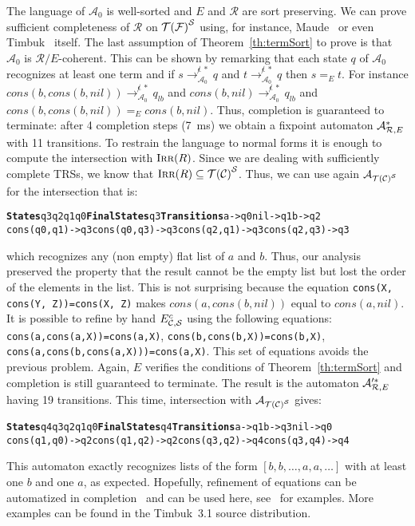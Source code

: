 \documentclass[a4paper,11pt]{llncs}
\renewcommand{\equiv}{=}
\newcommand{\A}{\mathcal{A}}
\def \R {\mathcal{R}}
\newcommand{\timbuk}{{\sf Timbuk}}
\newcommand{\C}{{\cal C}}
\newcommand{\TF}{{\cal T(F)}}
\newcommand{\TC}{{\cal T(C)}}
\def\sorts{\mathcal S}
\def\Eccs{E^c_{\C,\sorts}}
\def\TFS{\TF^\sorts}
\def\TCS{\TC^\sorts}
\DeclareMathOperator{\lirr}{I\textsc{rr}}
\newcommand{\nr}{E}
\newcommand{\aapprox}{{\cal A}_{\R, \nr}}
\newcommand{\rwAznestar}{\rightarrow^{\not\epsilon\: *}_{\A_0}}
\def\timFont{\bf}
\newcommand{\States}{{\timFont States}}
\newcommand{\FinalStates}{{\timFont Final States}}
\newcommand{\Transitions}{{\timFont Transitions}}
\theoremstyle{plain}
\begin{document}
\noindent
The language of $\A_0$ is well-sorted and $E$ and $\R$ are sort preserving.  We can
prove sufficient completeness of $\R$ on $\TFS$ using, for instance,
Maude~\cite{maude-manual} or even \timbuk~\cite{Genet-RTA98} itself. 
The last
assumption of Theorem~\ref{th:termSort} to prove is that $\A_0$ is
$\R/E$-coherent. This can be shown by remarking that each state $q$ of $\A_0$
recognizes at least one term and if $s \rwAznestar q$ and $t
\rwAznestar q$ then $s \equiv_E t$. For instance $cons(b, cons(b,nil))
\rwAznestar q_{lb}$ and $cons(b, nil) \rwAznestar q_{lb}$ and $cons(b,
cons(b,nil))\equiv_E cons(b, nil)$. Thus, completion is guaranteed to terminate:
after 4 completion steps (7~ms) we obtain a fixpoint automaton $\aapprox^*$
with 11 transitions. To restrain the language to normal forms it is
enough to compute the intersection with $\lirr(R)$.
Since we are dealing with sufficiently complete TRSs, we know that
$\lirr(R) \subseteq \TCS$. Thus, we can use again $\A_{\TCS}$ for the
intersection that is:
 
{\footnotesize
\begin{alltt}
\States q3 q2 q1 q0  \FinalStates q3  \Transitions a->q0  nil->q1  b->q2  
cons(q0,q1)->q3  cons(q0,q3)->q3  cons(q2,q1)->q3  cons(q2,q3)->q3
\end{alltt}
}
 
\noindent
which recognizes any (non empty) flat list of $a$ and $b$. Thus, our analysis  preserved
the property that the result cannot be the empty list but lost the order of the
elements in the list. This is not surprising because
the equation {\tt \footnotesize cons(X, cons(Y, Z))=cons(X, Z)}
makes $cons(a, cons(b, nil))$ equal to $cons(a,nil)$. It is possible to refine
by hand $\Eccs$ using the following equations: {\tt \footnotesize
  cons(a,cons(a,X))=cons(a,X)}, {\tt \footnotesize cons(b,cons(b,X))=cons(b,X)},
  {\tt \footnotesize cons(a,cons(b,cons(a,X)))=cons(a,X)}.
This set of equations avoids the previous problem. Again, 
$E$ verifies the conditions of Theorem~\ref{th:termSort} and completion is
still guaranteed to terminate. The result is the automaton $\aapprox'^*$ having 19
transitions. This time, intersection with $\A_{\TCS}$ gives:
 
{\footnotesize
\begin{alltt}
\States q4 q3 q2 q1 q0  \FinalStates q4  \Transitions a->q1  b->q3  nil->q0  
cons(q1,q0)->q2  cons(q1,q2)->q2  cons(q3,q2)->q4  cons(q3,q4)->q4
\end{alltt}  
}
 
\noindent
This automaton exactly recognizes lists of the form $[b,b, \ldots,a, a, \ldots]$ with at
least one $b$ and one $a$, as expected. Hopefully, refinement of equations
can be automatized in completion~\cite{BoichutBGL-ICFEM12} and can be used here,
see~\cite{GenetS-rep13} for examples. More examples can be found in the
\timbuk~3.1 source distribution.
\end{document}
